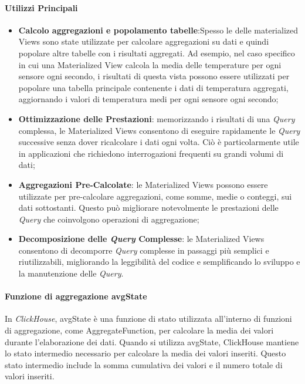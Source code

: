 \paragraph*{Utilizzi Principali}
\begin{itemize}
    \item \textbf{Calcolo aggregazioni e popolamento tabelle}:Spesso le delle materialized Views sono state utilizzate per calcolare aggregazioni su dati e quindi popolare altre tabelle con i risultati aggregati. Ad esempio, nel caso specifico in cui una Materialized View calcola la media delle temperature per ogni sensore ogni secondo, i risultati di questa vista possono essere utilizzati per popolare una tabella principale contenente i dati di temperatura aggregati, aggiornando i valori di temperatura medi per ogni sensore ogni secondo;
    \item \textbf{Ottimizzazione delle Prestazioni}: memorizzando i risultati di una \textit{Query} complessa, le Materialized Views consentono di eseguire rapidamente le \textit{Query} successive senza dover ricalcolare i dati ogni volta. Ciò è particolarmente utile in applicazioni che richiedono interrogazioni frequenti su grandi volumi di dati;
    \item \textbf{Aggregazioni Pre-Calcolate}: le Materialized Views possono essere utilizzate per pre-calcolare aggregazioni, come somme, medie o conteggi, sui dati sottostanti. Questo può migliorare notevolmente le prestazioni delle \textit{Query} che coinvolgono operazioni di aggregazione;
    \item \textbf{Decomposizione delle \textit{Query} Complesse}: le Materialized Views consentono di decomporre \textit{Query} complesse in passaggi più semplici e riutilizzabili, migliorando la leggibilità del codice e semplificando lo sviluppo e la manutenzione delle \textit{Query}.
\end{itemize}


\paragraph{Funzione di aggregazione avgState}
In \textit{ClickHouse}, avgState è una funzione di stato utilizzata all'interno di funzioni di aggregazione, come AggregateFunction, per calcolare la media dei valori durante l'elaborazione dei dati. Quando si utilizza avgState, ClickHouse mantiene lo stato intermedio necessario per calcolare la media dei valori inseriti. Questo stato intermedio include la somma cumulativa dei valori e il numero totale di valori inseriti.

